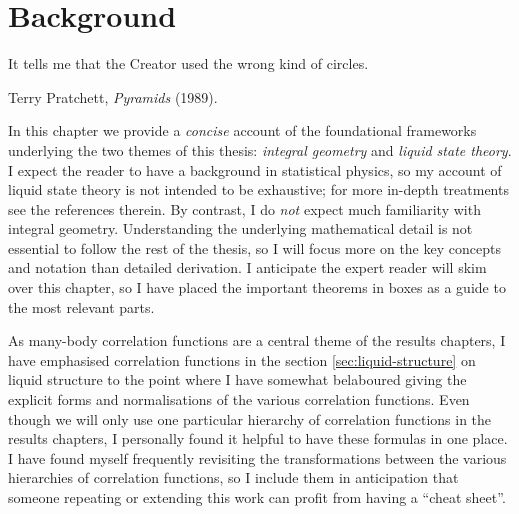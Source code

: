 \documentclass[11pt,twoside]{report}
\def\includebibliography{}
\begin{document}
\chapter{Background}
\epigraph{It tells me that the Creator used the wrong kind of circles.}{Terry Pratchett, \emph{Pyramids} (1989).}

In this chapter we provide a \emph{concise} account of the foundational frameworks underlying the two themes of this thesis: \emph{integral geometry} and \emph{liquid state theory}.
I expect the reader to have a background in statistical physics, so my account of liquid state theory is not intended to be exhaustive; for more in-depth treatments see the references therein.
By contrast, I do \emph{not} expect much familiarity with integral geometry.
Understanding the underlying mathematical detail is not essential to follow the rest of the thesis, so I will focus more on the key concepts and notation than detailed derivation.
I anticipate the expert reader will skim over this chapter, so I have placed the important theorems in boxes as a guide to the most relevant parts.

As many-body correlation functions are a central theme of the results chapters, I have emphasised correlation functions in the section \ref{sec:liquid-structure} on liquid structure to the point where I have somewhat belaboured giving the explicit forms and normalisations of the various correlation functions.
Even though we will only use one particular hierarchy of correlation functions in the results chapters, I personally found it helpful to have these formulas in one place.
I have found myself frequently revisiting the transformations between the various hierarchies of correlation functions, so I include them in anticipation that someone repeating or extending this work can profit from having a ``cheat sheet''.




%

\ifdefined\includebibliography
  \printbibliography
\fi
\end{document}
